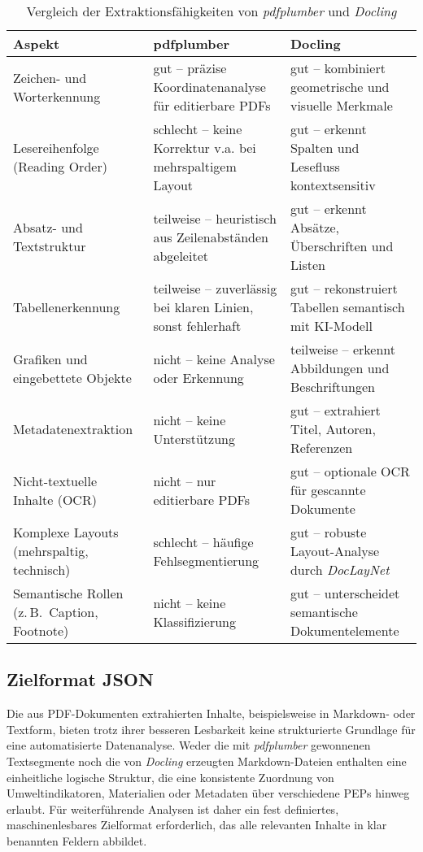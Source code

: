 \begin{table}[h!]
\centering
\caption{Vergleich der Extraktionsfähigkeiten von \textit{pdfplumber} und \textit{Docling}}
\label{tab:extraktion_vergleich}
\begin{tabular}{p{5cm}p{4cm}p{4cm}}
\hline
\textbf{Aspekt} & \textbf{pdfplumber} & \textbf{Docling} \\
\hline
Zeichen- und Worterkennung & gut – präzise Koordinatenanalyse für editierbare PDFs & gut – kombiniert geometrische und visuelle Merkmale \\
Lesereihenfolge (Reading Order) & schlecht – keine Korrektur v.a. bei mehrspaltigem Layout & gut – erkennt Spalten und Lesefluss kontextsensitiv \\
Absatz- und Textstruktur & teilweise – heuristisch aus Zeilenabständen abgeleitet & gut – erkennt Absätze, Überschriften und Listen \\
Tabellenerkennung & teilweise – zuverlässig bei klaren Linien, sonst fehlerhaft & gut – rekonstruiert Tabellen semantisch mit KI-Modell \\
Grafiken und eingebettete Objekte & nicht – keine Analyse oder Erkennung & teilweise – erkennt Abbildungen und Beschriftungen \\
Metadatenextraktion & nicht – keine Unterstützung & gut – extrahiert Titel, Autoren, Referenzen \\
Nicht-textuelle Inhalte (OCR) & nicht – nur editierbare PDFs & gut – optionale OCR für gescannte Dokumente \\
Komplexe Layouts (mehrspaltig, technisch) & schlecht – häufige Fehlsegmentierung & gut – robuste Layout-Analyse durch \emph{DocLayNet} \\
Semantische Rollen (z.\,B.\ Caption, Footnote) & nicht – keine Klassifizierung & gut – unterscheidet semantische Dokumentelemente \\
\hline
\end{tabular}
\end{table}


\subsection{Zielformat JSON}

Die aus PDF-Dokumenten extrahierten Inhalte, beispielsweise in Markdown- oder Textform, 
bieten trotz ihrer besseren Lesbarkeit keine strukturierte Grundlage für eine automatisierte Datenanalyse. 
Weder die mit \emph{pdfplumber} gewonnenen Textsegmente noch die von \emph{Docling} erzeugten Markdown-Dateien 
enthalten eine einheitliche logische Struktur, die eine konsistente Zuordnung von Umweltindikatoren, Materialien oder 
Metadaten über verschiedene PEPs hinweg erlaubt. 
Für weiterführende Analysen ist daher ein fest definiertes, maschinenlesbares Zielformat erforderlich, 
das alle relevanten Inhalte in klar benannten Feldern abbildet. 

